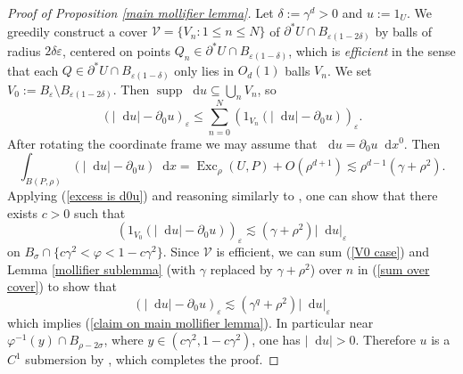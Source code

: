 \documentclass[final,12pt, leqno]{brownthesis}
\DeclareMathOperator{\Exc}{Exc}
\DeclareMathOperator{\supp}{supp}
\newcommand*\dif{\mathop{}\!\mathrm{d}}
\newcommand{\dfn}[1]{\emph{#1}\index{#1}}
\theoremstyle{definition}
\numberwithin{equation}{section}
\begin{document}
\begin{proof}[Proof of Proposition \ref{main mollifier lemma}]
Let $\delta := \gamma^d > 0$ and $u := 1_U$.
We greedily construct a cover $\mathcal V = \{V_n: 1 \leq n \leq N\}$ of $\partial^* U \cap B_{\varepsilon(1 - 2\delta)}$ by balls of radius $2\delta\varepsilon$, centered on points $Q_n \in \partial^* U \cap B_{\varepsilon(1 - \delta)}$, which is \dfn{efficient} in the sense that each $Q \in \partial^*U \cap B_{\varepsilon(1 - \delta)}$ only lies in $O_d(1)$ balls $V_n$.
We set $V_0 := B_\varepsilon \setminus B_{\varepsilon(1 - 2\delta)}$.
Then $\supp \dif u \subseteq \bigcup_n V_n$, so
\begin{equation}\label{sum over cover}
(|\dif u| - \partial_0 u)_\varepsilon \leq \sum_{n = 0}^N (1_{V_n} (|\dif u| - \partial_0 u))_\varepsilon.
\end{equation}
After rotating the coordinate frame we may assume that $\dif u = \partial_0 u \dif x^0$. Then
\begin{equation}\label{excess is d0u}
    \int_{B(P, \rho)} (|\dif u| - \partial_0 u) \dif x = \Exc_\rho(U, P) + O(\rho^{d + 1}) \lesssim \rho^{d - 1}(\gamma + \rho^2).
\end{equation}
Applying (\ref{excess is d0u}) and reasoning similarly to \cite[pg92]{Giusti77}, one can show that there exists $c > 0$ such that
\begin{equation}\label{V0 case}
    (1_{V_0} (|\dif u| - \partial_0 u))_\varepsilon \lesssim (\gamma + \rho^2) |\dif u|_\varepsilon
\end{equation}
on $B_\sigma \cap \{c\gamma^2 < \varphi < 1 - c\gamma^2\}$.
Since $\mathcal V$ is efficient, we can sum (\ref{V0 case}) and Lemma \ref{mollifier sublemma} (with $\gamma$ replaced by $\gamma + \rho^2$) over $n$ in (\ref{sum over cover}) to show that
$$(|\dif u| - \partial_0 u)_\varepsilon \lesssim (\gamma^q + \rho^2) |\dif u|_\varepsilon$$
which implies (\ref{claim on main mollifier lemma}).
In particular near $\varphi^{-1}(y) \cap B_{\rho - 2\sigma}$, where $y \in (c\gamma^2, 1 - c\gamma^2)$, one has $|\dif u| > 0$.
Therefore $u$ is a $C^1$ submersion by \cite[Lemma 7.1]{Giusti77}, which completes the proof.
\end{proof}
\end{document}
